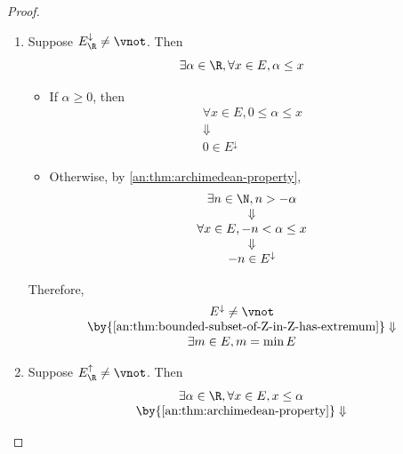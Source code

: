 \begin{proof}
  \leavevmode\par
  \begin{enumerate}[label=\textbf{(\Alph*)}]
    \item Suppose $E_{\R}^{\downarrow} \neq \vnot$. Then
          \[
            \exists \alpha \in \R, \forall x \in E, \alpha \leq x
          \]
          \begin{itemize}
            \item If $\alpha \geq 0$, then
                  \[
                    \begin{array}{c}
                      \forall x \in E, 0 \leq \alpha \leq x \\
                      \Downarrow                            \\
                      0 \in E^{\downarrow}
                    \end{array}
                  \]
            \item Otherwise, by \cref{an:thm:archimedean-property},
                  \[
                    \begin{array}{c}
                      \exists n \in \N, n > - \alpha       \\
                      \Downarrow                           \\
                      \forall x \in E, - n < \alpha \leq x \\
                      \Downarrow                           \\
                      -n \in E^{\downarrow}
                    \end{array}
                  \]
          \end{itemize}
          Therefore,
          \[
            \begin{array}{c}
              E^{\downarrow} \neq \vnot                                           \\
              \by{\Cref{an:thm:bounded-subset-of-Z-in-Z-has-extremum}} \Downarrow \\
              \exists m \in E, m = \min E
            \end{array}
          \]
    \item Suppose $E_{\R}^{\uparrow} \neq \vnot$. Then
          \[
            \begin{array}{c}
              \exists \alpha \in \R, \forall x \in E, x \leq \alpha               \\
              \by{\Cref{an:thm:archimedean-property}} \Downarrow                  \\

\end{array}\]
\end{enumerate}
\end{proof}
